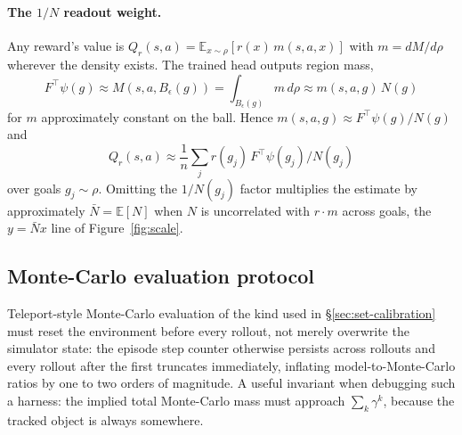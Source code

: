 \documentclass{article}
\newcommand{\E}{\mathbb{E}}
\begin{document}
\paragraph{The $1/N$ readout weight.}
Any reward's value is $Q_{r}(s,a)=\E_{x\sim\rho}[r(x)\,m(s,a,x)]$ with $m=dM/d\rho$ wherever the density exists.
The trained head outputs region mass,
\begin{equation*}
F^{\top}\psi(g)\approx M(s,a,B_\epsilon(g))=\int_{B_\epsilon(g)}m\,d\rho \approx m(s,a,g)\,N(g)
\end{equation*}
for $m$ approximately constant on the ball.
Hence $m(s,a,g)\approx F^{\top}\psi(g)/N(g)$ and
\begin{equation*}
Q_{r}(s,a)\approx\frac{1}{n}\sum_{j}r(g_{j})\,F^{\top}\psi(g_{j})/N(g_{j})
\end{equation*}
over goals $g_{j}\sim\rho$.
Omitting the $1/N(g_{j})$ factor multiplies the estimate by approximately $\bar N=\E[N]$ when $N$ is uncorrelated with $r\cdot m$ across goals, the $y=\bar N x$ line of Figure~\ref{fig:scale}.

\subsection{Monte-Carlo evaluation protocol}
\label{app:mc}

Teleport-style Monte-Carlo evaluation of the kind used in \S\ref{sec:set-calibration} must reset the environment before every rollout, not merely overwrite the simulator state: the episode step counter otherwise persists across rollouts and every rollout after the first truncates immediately, inflating model-to-Monte-Carlo ratios by one to two orders of magnitude.
A useful invariant when debugging such a harness: the implied total Monte-Carlo mass must approach $\sum_k\gamma^k$, because the tracked object is always somewhere.
\end{document}
